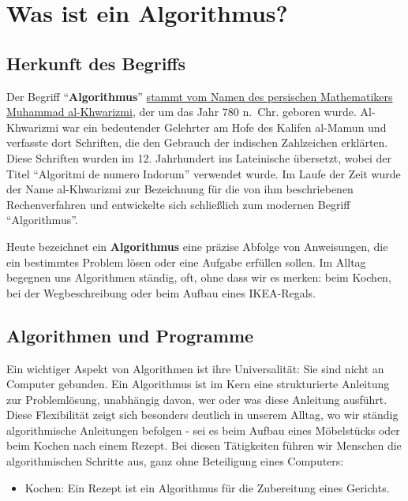 \documentclass[
  letterpaper,
  DIV=11]{scrreprt}
\providecommand{\tightlist}{%
  \setlength{\itemsep}{0pt}\setlength{\parskip}{0pt}}\usepackage{longtable,booktabs,array}
\begin{document}
\section{Was ist ein Algorithmus?}\label{was-ist-ein-algorithmus}

\subsection{Herkunft des Begriffs}\label{herkunft-des-begriffs}

Der Begriff ``\textbf{Algorithmus}''
\href{https://www.wissenschaftsjahr.de/2008/coremedia/generator/wj2008/de/02__Mathematik__alles__was__z_C3_A4hlt/05__KW50__Algorithmus.html}{stammt
vom Namen des persischen Mathematikers Muhammad al-Khwarizmi}, der um
das Jahr 780 n.~Chr. geboren wurde. Al-Khwarizmi war ein bedeutender
Gelehrter am Hofe des Kalifen al-Mamun und verfasste dort Schriften, die
den Gebrauch der indischen Zahlzeichen erklärten. Diese Schriften wurden
im 12. Jahrhundert ins Lateinische übersetzt, wobei der Titel
``Algoritmi de numero Indorum'' verwendet wurde. Im Laufe der Zeit wurde
der Name al-Khwarizmi zur Bezeichnung für die von ihm beschriebenen
Rechenverfahren und entwickelte sich schließlich zum modernen Begriff
``Algorithmus''.

Heute bezeichnet ein \textbf{Algorithmus} eine präzise Abfolge von
Anweisungen, die ein bestimmtes Problem lösen oder eine Aufgabe erfüllen
sollen. Im Alltag begegnen uns Algorithmen ständig, oft, ohne dass wir
es merken: beim Kochen, bei der Wegbeschreibung oder beim Aufbau eines
IKEA-Regals.

\subsection{Algorithmen und Programme}\label{algorithmen-und-programme}

Ein wichtiger Aspekt von Algorithmen ist ihre Universalität: Sie sind
nicht an Computer gebunden. Ein Algorithmus ist im Kern eine
strukturierte Anleitung zur Problemlösung, unabhängig davon, wer oder
was diese Anleitung ausführt. Diese Flexibilität zeigt sich besonders
deutlich in unserem Alltag, wo wir ständig algorithmische Anleitungen
befolgen - sei es beim Aufbau eines Möbelstücks oder beim Kochen nach
einem Rezept. Bei diesen Tätigkeiten führen wir Menschen die
algorithmischen Schritte aus, ganz ohne Beteiligung eines Computers:

\begin{itemize}
\tightlist
\item
  Kochen: Ein Rezept ist ein Algorithmus für die Zubereitung eines
  Gerichts.
\end{itemize}
\end{document}
